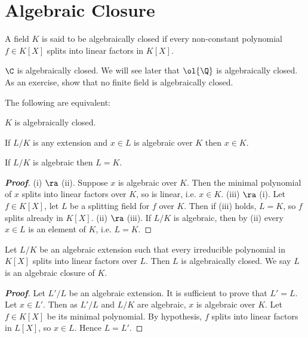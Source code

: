 \section{Algebraic Closure}

\begin{definition}
A field $K$ is said to be algebraically closed if every non-constant polynomial $f \in K[X]$ splits into linear factors in $K[X]$.
\end{definition}

\begin{example}
$\C$ is algebraically closed. We will see later that $\ol{\Q}$ is algebraically closed. As an exercise, show that no finite field is algebraically closed.
\end{example}

\begin{proposition}
The following are equivalent:
\ben
\item [(i)] $K$ is algebraically closed.
\item [(ii)] If $L/K$ is any extension and $x \in L$ is algebraic over $K$ then $x \in K$.
\item [(iii)] If $L/K$ is algebraic then $L = K$.
\een
\end{proposition}

\begin{proof}[\bf Proof]
(i) $\ra$ (ii). Suppose $x$ is algebraic over $K$. Then the minimal polynomial of $x$ splits into linear factors over $K$, so is linear, i.e. $x \in K$.
(iii) $\ra$ (i). Let $f \in K[X]$, let $L$ be a splitting field for $f$ over $K$. Then if (iii) holds, $L = K$, so $f$ splits already in $K[X]$.
(ii) $\ra$ (iii). If $L/K$ is algebraic, then by (ii) every $x \in L$ is an element of $K$, i.e. $L = K$.
\end{proof}

\begin{proposition}
Let $L/K$ be an algebraic extension such that every irreducible polynomial in $K[X]$ splits into linear factors over $L$. Then $L$ is algebraically closed. We say $L$ is an algebraic closure of $K$.
\end{proposition}

\begin{proof}[\bf Proof]
Let $L'/L$ be an algebraic extension. It is sufficient to prove that $L' = L$. Let $x \in L'$. Then as $L'/L$ and $L/K$ are algebraic, $x$ is algebraic over $K$. Let $f \in K[X]$ be its minimal polynomial. By hypothesis, $f$ splits into linear factors in $L[X]$, so $x \in L$. Hence $L = L'$.
\end{proof}

